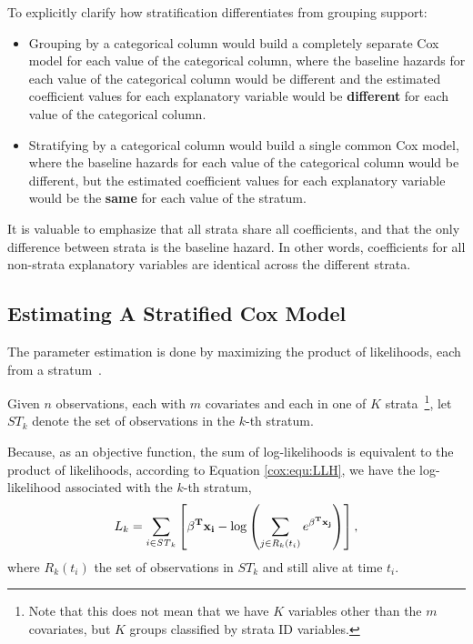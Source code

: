 To explicitly clarify how stratification differentiates from grouping support:
\begin{itemize}
    \item Grouping by a categorical column would build a completely separate
    Cox model for each value of the categorical column, where the baseline
    hazards for each value of the categorical column would be different and
    the estimated coefficient values for each explanatory variable would be
    \textbf{different} for each value of the categorical column.
    \item Stratifying by a categorical column would build a single
    common Cox model, where the baseline hazards for each value of the
    categorical column would be different, but the estimated coefficient values
    for each explanatory variable would be the \textbf{same} for each value of the stratum.
\end{itemize}

It is valuable to emphasize that all strata share all coefficients, and that the
only difference between strata is the baseline hazard.  In other words,
coefficients for all non-strata explanatory variables are identical across the
different strata.

\subsection{Estimating A Stratified Cox Model}\label{cox:estimate-stratified}
The parameter estimation is done by maximizing the product of likelihoods, each
from a stratum~\cite{stratified-ethz-slides}.

Given $n$ observations, each with $m$ covariates and each in one of $K$
strata~\footnote{Note that this does not mean that we have $K$ variables other
than the $m$ covariates, but $K$ groups classified by strata ID variables.}, let
$\mathit{ST}_{k}$ denote the set of observations in the $k$-th stratum.

Because, as an objective function, the sum of log-likelihoods is equivalent to
the product of likelihoods, according to Equation \ref{cox:equ:LLH}, we have the
log-likelihood associated with the $k$-th stratum,
\begin{equation}\label{cox:equ:obj-each-stratum}L_{k} = \sum_{i \in \mathit{ST}_{k}} \left[  \bold{\beta^T x_i} - \log\left(\sum_{j \in R_k(t_i)} e^{\bold{\beta^T x_j} } \right) \right],
\end{equation}
where $R_k(t_i)$ the set of observations in $\mathit{ST}_{k}$ and still alive at time $t_i$.

